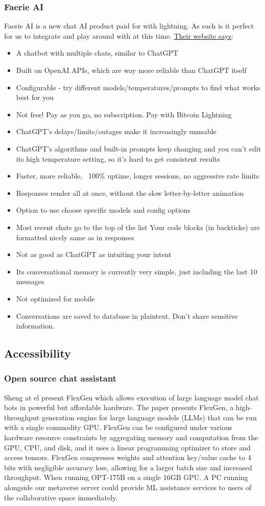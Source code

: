 \subsubsection{Faerie AI}
Faerie AI is a new chat AI product paid for with lightning. As such is it perfect for us to integrate and play around with at this time. \href{https://faerie.ai/}{Their website says}:
\begin{itemize}
\item A chatbot with multiple chats, similar to ChatGPT
\item Built on OpenAI APIs, which are way more reliable than ChatGPT itself
\item Configurable - try different models/temperatures/prompts to find what works best for you
\item Not free! Pay as you go, no subscription.
Pay with Bitcoin Lightning
\item ChatGPT's delays/limits/outages make it increasingly unusable
\item ChatGPT's algorithms and built-in prompts keep changing and you can't edit its high temperature setting, so it's hard to get consistent results
\item Faster, more reliable, ~100\% uptime, longer sessions, no aggressive rate limits
\item Responses render all at once, without the slow letter-by-letter animation
\item Option to use choose specific models and config options
\item Most recent chats go to the top of the list
Your code blocks (in backticks) are formatted nicely same as in responses
\item Not as good as ChatGPT as intuiting your intent
\item Its conversational memory is currently very simple, just including the last 10 messages
\item Not optimized for mobile
\item Conversations are saved to database in plaintext. Don't share sensitive information.
\end{itemize}
\subsection{Accessibility}
\subsubsection{Open source chat assistant}
Sheng at el present FlexGen which allows execution of large language model chat bots in powerful but affordable hardware\cite{Sheng2023}. The paper presents FlexGen, a high-throughput generation engine for large language models (LLMs) that can be run with a single commodity GPU. FlexGen can be configured under various hardware resource constraints by aggregating memory and computation from the GPU, CPU, and disk, and it uses a linear programming optimizer to store and access tensors. FlexGen compresses weights and attention key/value cache to 4 bits with negligible accuracy loss, allowing for a larger batch size and increased throughput. When running OPT-175B on a single 16GB GPU. A PC running alongside our metaverse server could provide ML assistance services to users of the collaborative space immediately.
